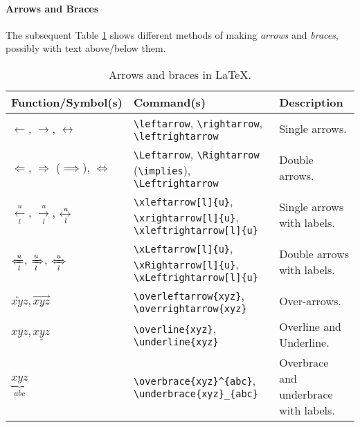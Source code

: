 \paragraph{Arrows and Braces} The subsequent Table \ref{tab:arrowbrace} shows different methods of making \textit{arrows} and \textit{braces}, possibly with text above/below them.

\begin{table}[ht!]
\begin{tabularx}{\textwidth}{|p{}|>{\raggedright}p{}|X|}
\hline
Function/Symbol(s) & Command(s) & Description \\
\hline
$\leftarrow$, $\rightarrow$, $\leftrightarrow$ & \texttt{\textbackslash leftarrow}, \texttt{\textbackslash rightarrow}, \texttt{\textbackslash leftrightarrow} & Single arrows. \\
\hline
$\Leftarrow$, $\Rightarrow$ ($\implies$), $\Leftrightarrow$ & \texttt{\textbackslash Leftarrow}, \texttt{\textbackslash Rightarrow} (\texttt{\textbackslash implies}), \texttt{\textbackslash Leftrightarrow} & Double arrows. \\
\hline
$\xleftarrow[l]{u}$, $\xrightarrow[l]{u}$, $\xleftrightarrow[l]{u}$ & \texttt{\textbackslash xleftarrow[l]\{u\}}, \texttt{\textbackslash xrightarrow[l]\{u\}}, \texttt{\textbackslash xleftrightarrow[l]\{u\}} & Single arrows with labels. \\
\hline
$\xLeftarrow[l]{u}$, $\xRightarrow[l]{u}$, $\xLeftrightarrow[l]{u}$ & \texttt{\textbackslash xLeftarrow[l]\{u\}}, \texttt{\textbackslash xRightarrow[l]\{u\}}, \texttt{\textbackslash xLeftrightarrow[l]\{u\}} & Double arrows with labels. \\
\hline
$\overleftarrow{xyz}, \overrightarrow{xyz}$ & \texttt{\textbackslash overleftarrow\{xyz\}}, \texttt{\textbackslash overrightarrow\{xyz\}} & Over-arrows. \\
\hline
$\overline{xyz}, \underline{xyz}$ & \texttt{\textbackslash overline\{xyz\}}, \texttt{\textbackslash underline\{xyz\}} & Overline and Underline. \\
\hline
\raisebox{-10pt}{\smash{$\overbrace{xyz}^{abc}$},} $\underbrace{xyz}_{abc}$ & \texttt{\textbackslash overbrace\{xyz\}\^{}\{abc\}}, \texttt{\textbackslash underbrace\{xyz\}\_\{abc\}} & Overbrace and underbrace with labels. \\
\hline
\end{tabularx}
\caption{Arrows and braces in \LaTeX{}.}
\label{tab:arrowbrace}
\end{table}

